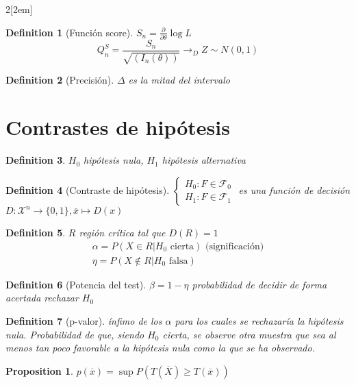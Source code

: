 \documentclass[leqno]{article}
\newtheorem*{proposition}{Proposition}
\newtheorem*{definition}{Definition}
\begin{document}
\begin{multicols}{2}[\columnsep2em]
\begin{definition}[Función score] $S_n = \frac{\partial}{\partial \theta } \log L$
  \[
	Q_n^{S} = \frac{S_n}{\sqrt{(I_n(\theta ))} } \to _D Z \sim N(0,1)
  \] 
\end{definition}

\begin{definition}[Precisión] $\Delta $ es la mitad del intervalo
\end{definition}


\section{Contrastes de hipótesis}
\begin{definition} $H_0$ hipótesis nula, $H_1$ hipótesis alternativa
\end{definition}

\begin{definition}[Contraste de hipótesis] $\begin{cases}
  H_0: F \in \mathcal{F}_0\\
  H_1: F \in \mathcal{F}_1
\end{cases}$ 
es una función de decisión $D:\mathcal{X}^n \to \{0,1\}, \overline{x} \mapsto D(x)$
\end{definition}

\begin{definition} $R$ región crítica tal que  $D(R)=1$
\begin{align*}
  \alpha = P(X\in R|H_0 \text{ cierta}) \text{ (significación)}\\
  \eta = P(X \not\in  R|H_0 \text{ falsa})
\end{align*}
\end{definition}

\begin{definition}[Potencia del test] $\beta = 1-\eta$ probabilidad de decidir de forma acertada rechazar $H_0$
\end{definition}

\begin{definition}[p-valor] ínfimo de los $\alpha $ para los cuales se rechazaría la hipótesis nula.
  Probabilidad de que, siendo $H_0$ cierta, se observe otra muestra que sea al menos tan poco favorable a la hipótesis nula como la que se ha observado.
\end{definition}

\begin{proposition}$p(\overline{x}) = \sup P(T(\overline{X})\ge T(\overline{x}))$ 
\end{proposition}


\end{multicols}
\end{document}
